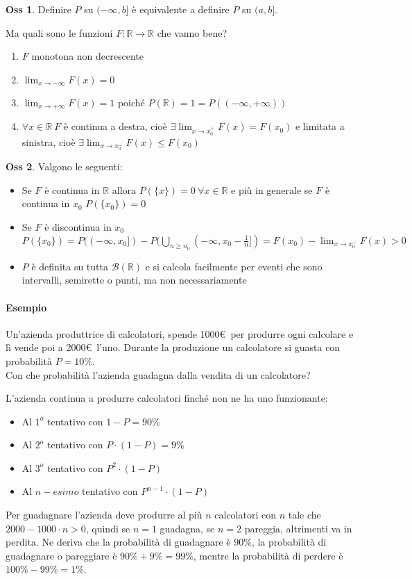 \documentclass[12pt, a4paper]{report}
\theoremstyle{definition}
\newtheorem*{observation}{Oss}
\DeclareRobustCommand{\R}{\mathbb{R}}%
\DeclareRobustCommand{\B}{\mathcal{B}}%
\begin{document}
\begin{observation}
	Definire $P$ su \((-\infty,b]\) è equivalente a definire $P$ su \((a,b]\).
\end{observation}

Ma quali sono le funzioni \(F:\R\rightarrow\R\) che vanno bene?
\begin{enumerate}[label=(\roman*)]
	\item $F$ monotona non decrescente
	\item \(\lim_{x\rightarrow -\infty}F(x)=0\)
	\item \(\lim_{x\rightarrow +\infty}F(x)=1\) poiché \(P(\R)=1=
	P((-\infty,+\infty))\)
	\item \(\forall x\in\R\ F\) è continua a destra, cioè \(\exists\lim_
	{x\rightarrow x_0^+}F(x)=F(x_0)\) e limitata a sinistra, cioè \(\exists\lim_
	{x\rightarrow x_0^-}F(x)\leq F(x_0)\)
\end{enumerate}

\begin{observation}
	Valgono le seguenti:
	\begin{itemize}
		\item Se $F$ è continua in $\R$ allora \(P(\{x\})=0\ \forall x\in\R\) e più in
		generale se $F$ è continua in $x_0$ \(P(\{x_0\})=0\)
		\item Se $F$ è discontinua in $x_0$ \(P(\{x_0\})=P((-\infty,x_0])-P(
		\bigcup_{n\geq n_0}(-\infty,x_0-\frac{1}{n}])=F(x_0)-\lim_{x\rightarrow
		x_0^-}F(x)>0\)
		\item $P$ è definita su tutta $\B(\R)$ e si calcola facilmente per eventi
		che sono intervalli, semirette o punti, ma non necessariamente
	\end{itemize}
\end{observation}

\paragraph*{Esempio}
Un'azienda produttrice di calcolatori, spende 1000\euro\ per produrre ogni calcolare
e lì vende poi a 2000\euro\ l'uno. Durante la produzione un calcolatore si guasta
con probabilità $P=10\%$.\\
Con che probabilità l'azienda guadagna dalla vendita di un calcolatore?

L'azienda continua a produrre calcolatori finché non ne ha uno funzionante:
\begin{itemize}
	\item Al $1^o$ tentativo con \(1-P=90\%\)
	\item Al $2^o$ tentativo con \(P\cdot (1-P)=9\%\)
	\item Al $3^o$ tentativo con \(P^2\cdot (1-P)\)
	\item Al $n-esimo$ tentativo con \(P^{n-1}\cdot (1-P)\)
\end{itemize}
\newpage
Per guadagnare l'azienda deve produrre al più $n$ calcolatori con $n$ tale che
\(2000-1000\cdot n>0\), quindi se $n=1$ guadagna, se $n=2$ pareggia, altrimenti va in
perdita. Ne deriva che la probabilità di guadagnare è $90\%$, la probabilità di
guadagnare o pareggiare è $90\% + 9\%=99\%$, mentre la probabilità di perdere è
$100\%-99\%=1\%$.
\end{document}
